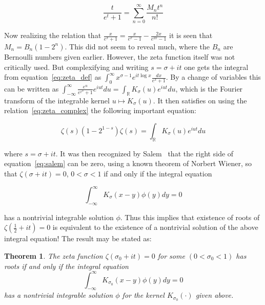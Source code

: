 \documentclass[11pt]{article}
\newtheorem{theorem}{Theorem}
\begin{document}
\begin{equation}
\label{eq:taylor_alt}
\frac{t}{e^t + 1} = \sum_{n=0}^\infty \frac{M_n t^n}{n!}
\end{equation}

Now realizing the relation that $\frac{x}{e^x+1} = \frac{x}{e^x-1} - \frac{2x}{e^{2x}-1}$ it is seen that $M_n = B_n(1 - 2^n)$. This did not seem to reveal much, where the $B_n$ are Bernoulli numbers given earlier. However, the zeta function itself was not critically used. But complexifying and writing $s = \sigma + it$ one gets the integral from equation~\eqref{eq:zeta_def} as $\int_0^\infty x^{\sigma-1} e^{it \log x} \frac{dx}{e^x+1}$. By a change of variables this can be written as $\int_{-\infty}^\infty \frac{e^u}{e^{e^u} +1} e^{iut} du = \int_{\mathbb{R}} K_\sigma(u) e^{iut} du$, which is the Fourier transform of the integrable kernel $u \mapsto K_\sigma(u)$. It then satisfies on using the relation~\eqref{eq:zeta_complex} the following important equation:

\begin{equation}
\label{eq:salem}
\zeta(s)(1 - 2^{1-s}) \zeta(s) = \int_{\mathbb{R}} K_\sigma(u) e^{iut} du
\end{equation}

where $s = \sigma + it$. It was then recognized by Salem~\cite{salem} that the right side of equation~\eqref{eq:salem} can be zero, using a known theorem of Norbert Wiener, so that $\zeta(\sigma + it) = 0$, $0 < \sigma < 1$ if and only if the integral equation

\begin{equation}
\label{eq:integral_eq}
\int_{-\infty}^\infty K_\sigma(x - y) \phi(y) dy = 0
\end{equation}

has a nontrivial integrable solution $\phi$. Thus this implies that existence of roots of $\zeta(\frac{1}{2} + it) = 0$ is equivalent to the existence of a nontrivial solution of the above integral equation! The result may be stated as:

\begin{theorem}
\label{thm:salem}
The zeta function $\zeta(\sigma_0 + it) = 0$ for some $(0 < \sigma_0 < 1)$ has roots if and only if the integral equation
\begin{equation}
\label{eq:salem_integral}
\int_{-\infty}^\infty K_{\sigma_0}(x - y) \phi(y) dy = 0
\end{equation}
has a nontrivial integrable solution $\phi$ for the kernel $K_{\sigma_0}(\cdot)$ given above.
\end{theorem}
\end{document}
